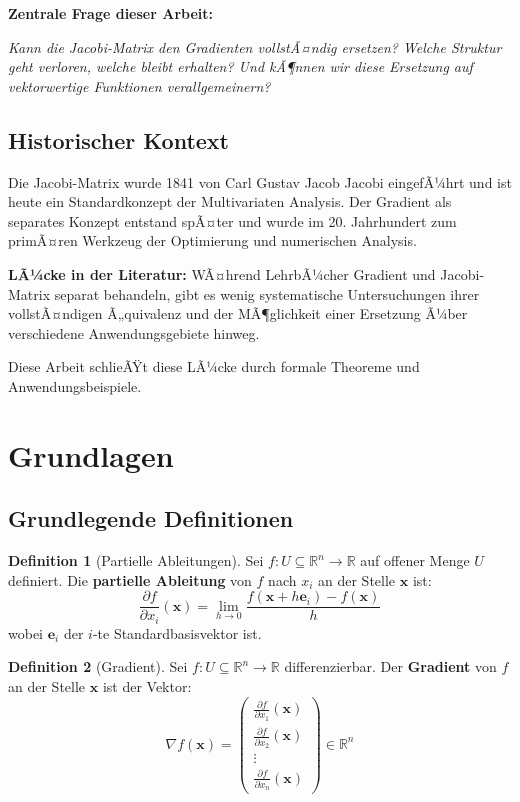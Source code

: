 ﻿\documentclass[a4paper,12pt]{article}
\theoremstyle{definition}
\newtheorem{definition}{Definition}
\begin{document}
\textbf{Zentrale Frage dieser Arbeit:} 

\emph{Kann die Jacobi-Matrix den Gradienten vollstÃ¤ndig ersetzen? Welche Struktur geht verloren, welche bleibt erhalten? Und kÃ¶nnen wir diese Ersetzung auf vektorwertige Funktionen verallgemeinern?}

\subsection{Historischer Kontext}

Die Jacobi-Matrix wurde 1841 von Carl Gustav Jacob Jacobi eingefÃ¼hrt und ist heute ein Standardkonzept der Multivariaten Analysis. Der Gradient als separates Konzept entstand spÃ¤ter und wurde im 20. Jahrhundert zum primÃ¤ren Werkzeug der Optimierung und numerischen Analysis.

\textbf{LÃ¼cke in der Literatur:} WÃ¤hrend LehrbÃ¼cher Gradient und Jacobi-Matrix separat behandeln, gibt es wenig systematische Untersuchungen ihrer vollstÃ¤ndigen Ã„quivalenz und der MÃ¶glichkeit einer Ersetzung Ã¼ber verschiedene Anwendungsgebiete hinweg.

Diese Arbeit schlieÃŸt diese LÃ¼cke durch formale Theoreme und Anwendungsbeispiele.

\section{Grundlagen}

\subsection{Grundlegende Definitionen}

\begin{definition}[Partielle Ableitungen]
	Sei $f: U \subseteq \mathbb{R}^n \to \mathbb{R}$ auf offener Menge $U$ definiert. Die \textbf{partielle Ableitung} von $f$ nach $x_i$ an der Stelle $\boldsymbol{x}$ ist:
	\[
	\frac{\partial f}{\partial x_i}(\boldsymbol{x}) = \lim_{h \to 0} \frac{f(\boldsymbol{x} + h\boldsymbol{e}_i) - f(\boldsymbol{x})}{h}
	\]
	wobei $\boldsymbol{e}_i$ der $i$-te Standardbasisvektor ist.
\end{definition}

\begin{definition}[Gradient]
	Sei $f: U \subseteq \mathbb{R}^n \to \mathbb{R}$ differenzierbar. Der \textbf{Gradient} von $f$ an der Stelle $\boldsymbol{x}$ ist der Vektor:
	\[
	\nabla f(\boldsymbol{x}) = \begin{pmatrix} 
		\frac{\partial f}{\partial x_1}(\boldsymbol{x}) \\
		\frac{\partial f}{\partial x_2}(\boldsymbol{x}) \\
		\vdots \\
		\frac{\partial f}{\partial x_n}(\boldsymbol{x})
	\end{pmatrix} \in \mathbb{R}^n
	\]
\end{definition}
\end{document}
